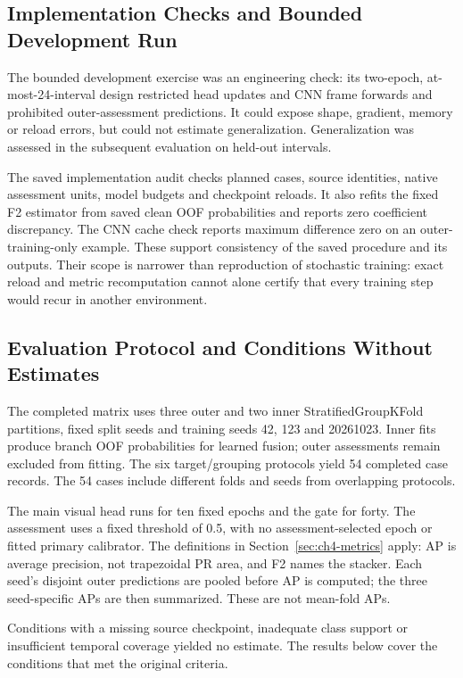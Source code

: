 \subsection{Implementation Checks and Bounded Development Run}
The bounded development exercise was an engineering check: its two-epoch,
at-most-24-interval design restricted head updates and CNN frame forwards and prohibited
outer-assessment predictions. It could expose shape, gradient, memory or reload errors,
but could not estimate generalization. Generalization was assessed in the subsequent
evaluation on held-out intervals.

The saved implementation audit checks planned cases, source identities, native
assessment units, model budgets and checkpoint reloads. It also refits the fixed F2
estimator from saved clean OOF probabilities and reports zero coefficient discrepancy.
The CNN cache check reports maximum difference zero on an outer-training-only example.
These support consistency of the saved procedure and its outputs. Their scope is
narrower than reproduction of stochastic training: exact reload and metric recomputation
cannot alone certify that every training step would recur in another environment.

\subsection{Evaluation Protocol and Conditions Without Estimates}
The completed matrix uses three outer and two inner StratifiedGroupKFold partitions,
fixed split seeds and training seeds 42, 123 and 20261023. Inner fits produce branch OOF
probabilities for learned fusion; outer assessments remain excluded from fitting. The
six target/grouping protocols yield 54 completed case records. The 54 cases include
different folds and seeds from overlapping protocols.

The main visual head runs for ten fixed epochs and the gate for forty. The assessment
uses a fixed threshold of 0.5, with no assessment-selected epoch or fitted primary
calibrator. The definitions in Section~\ref{sec:ch4-metrics} apply: AP is average precision,
not trapezoidal PR area, and F2 names the stacker. Each seed's disjoint outer predictions
are pooled before AP is computed; the three seed-specific APs are then summarized.
These are not mean-fold APs.

Conditions with a missing source checkpoint, inadequate class support or insufficient
temporal coverage yielded no estimate. The results below cover the conditions that met
the original criteria.

